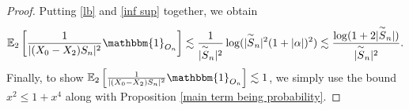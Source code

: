 \documentclass[9pt,a4paper,reqno]{amsart}
\newcommand{\tildea}[1]{\overset{\sim}{#1}}
\theoremstyle{mine}
\theoremstyle{definition}
\theoremstyle{remark}
\begin{document}
\begin{proof}
Putting \eqref{lb} and \eqref{inf sup} together, we obtain
\begin{align*}
    \mathbb{E}_2\left[  \frac{1}{|(X_0-X_2)S_n|^2} \mathbbm{1}_{O_n}
     \right] \lesssim \frac{1}{|\tildea{S}_n|^2}\log(|\tildea{S}_n|^2(1+|\alpha|)^2)  \lesssim  \frac{\log(1+2|\tildea{S}_n|)}{|\tildea{S}_n|^2}.
\end{align*}
Finally, to show $\mathbb{E}_2\left[  \frac{1}{|(X_0-X_2)S_n|^2} \mathbbm{1}_{O_n}
     \right] \lesssim 1$, we simply use the bound 
     $x^2\leq 1+ x^4$ along with                                                                                                                                                                                                                                                                                                                                                                                                                                                                                                                                                                                                                                                                                                                                                                                                                                                                                                                                                                                                                                                                                                                                                                                                                                                                                                                                                                                                                                                                                                                                                                                                                                                                                                                                                                                                                                                                                                                                                 Proposition \ref{main term being probability}.
\end{proof}
\end{document}
